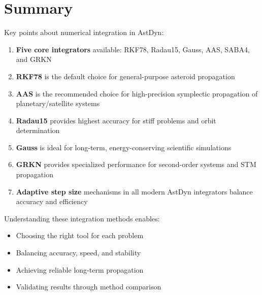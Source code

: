 \section{Summary}

Key points about numerical integration in AstDyn:

\begin{enumerate}
    \item \textbf{Five core integrators} available: RKF78, Radau15, Gauss, AAS, SABA4, and GRKN
    \item \textbf{RKF78} is the default choice for general-purpose asteroid propagation
    \item \textbf{AAS} is the recommended choice for high-precision symplectic propagation of planetary/satellite systems
    \item \textbf{Radau15} provides highest accuracy for stiff problems and orbit determination
    \item \textbf{Gauss} is ideal for long-term, energy-conserving scientific simulations
    \item \textbf{GRKN} provides specialized performance for second-order systems and STM propagation
    \item \textbf{Adaptive step size} mechanisms in all modern AstDyn integrators balance accuracy and efficiency
\end{enumerate}

Understanding these integration methods enables:
\begin{itemize}
    \item Choosing the right tool for each problem
    \item Balancing accuracy, speed, and stability
    \item Achieving reliable long-term propagation
    \item Validating results through method comparison
\end{itemize}
